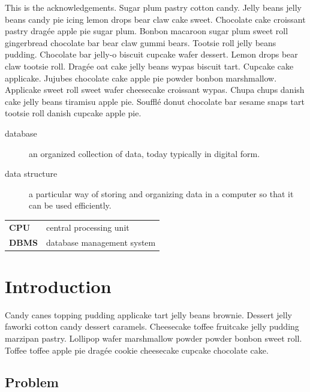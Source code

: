 \documentclass{uumthesis}
\begin{document}
\begin{acknowledge}
This is the acknowledgements. Sugar plum pastry cotton candy. Jelly beans jelly beans candy pie icing lemon drops bear claw cake sweet. Chocolate cake croissant pastry dragée apple pie sugar plum. Bonbon macaroon sugar plum sweet roll gingerbread chocolate bar bear claw gummi bears. Tootsie roll jelly beans pudding. Chocolate bar jelly-o biscuit cupcake wafer dessert. Lemon drops bear claw tootsie roll. Dragée oat cake jelly beans wypas biscuit tart. Cupcake cake applicake. Jujubes chocolate cake apple pie powder bonbon marshmallow. Applicake sweet roll sweet wafer cheesecake croissant wypas. Chupa chups danish cake jelly beans tiramisu apple pie. Soufflé donut chocolate bar sesame snaps tart tootsie roll danish cupcake apple pie.
\end{acknowledge}

\tableofcontents
\listoftables
\listoffigures
\listofappendices

\myglosslist
\begin{description}
   \item[database] an organized collection of data, today typically in digital form.
   \item[data structure] a particular way of storing and organizing data in a computer so that it can be used efficiently.
\end{description}

\myabbrevlist
\begin{tabular}{>{\bfseries}l l}
   CPU & central processing unit\\
   DBMS & database management system\\
\end{tabular}

\mainmatter

\chapter{Introduction}
Candy canes topping pudding applicake tart jelly beans brownie. Dessert jelly faworki cotton candy dessert caramels. Cheesecake toffee fruitcake jelly pudding marzipan pastry. Lollipop wafer marshmallow powder powder bonbon sweet roll. Toffee toffee apple pie dragée cookie cheesecake cupcake chocolate cake.

\section{Problem}
\end{document}
